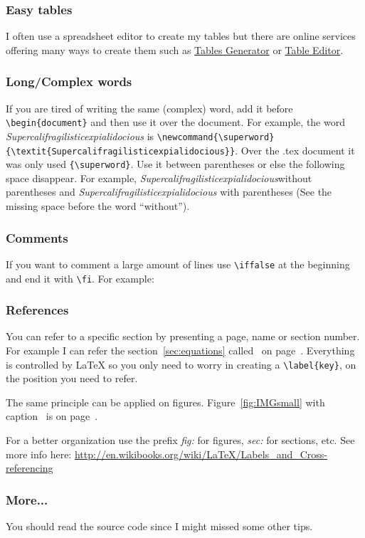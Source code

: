 \documentclass[a4paper,12pt]{article}
\newcommand{\superword}{\textit{Supercalifragilisticexpialidocious}}
\begin{document}
\subsubsection{Easy tables}
I often use a spreadsheet editor to create my tables but there are online services offering many ways to create them such as \href{http://www.tablesgenerator.com/}{Tables Generator} or \href{http://truben.no/latex/table/}{Table Editor}.

\subsubsection{Long/Complex words}
If you are tired of writing the same (complex) word, add it before \verb|\begin{document}| and then use it over the document. For example, the word {\superword} is \verb|\newcommand{\superword}{\textit{Supercalifragilisticexpialidocious}}|. Over the .tex document it was only used \verb|{\superword}|. Use it between parentheses or else the following space disappear. For example, \superword without parentheses and {\superword} with parentheses (See the missing space before the word ``without'').

\subsubsection{Comments}
If you want to comment a large amount of lines use \verb|\iffalse| at the beginning and end it with \verb|\fi|. For example:

\subsubsection{References}
You can refer to a specific section by presenting a page, name or section number. For example I can refer the section~\ref{sec:equations} called~ on page~\pageref{sec:equations}. Everything is controlled by {\LaTeX} so you only need to worry in creating a \verb|\label{key}|, on the position you need to refer.

The same principle can be applied on figures. Figure~\ref{fig:IMGsmall} with caption~ is on page~\pageref{fig:IMGsmall}.



For a better organization use the prefix \textit{fig:} for figures, \textit{sec:} for sections, etc. See more info here: \url{http://en.wikibooks.org/wiki/LaTeX/Labels_and_Cross-referencing}

\subsubsection{More...}

You should read the source code since I might missed some other tips.
\end{document}
